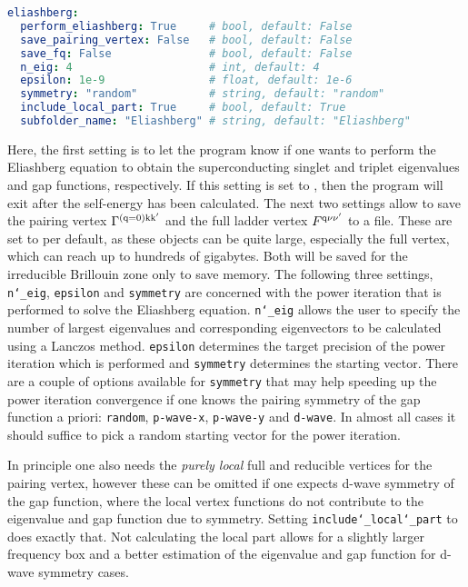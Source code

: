\documentclass[\main/main.tex]{subfiles}
\begin{document}
\begin{minipage}{\textwidth}%
\begin{lstlisting}[language=yaml]
eliashberg:
  perform_eliashberg: True     # bool, default: False
  save_pairing_vertex: False   # bool, default: False
  save_fq: False               # bool, default: False
  n_eig: 4                     # int, default: 4
  epsilon: 1e-9                # float, default: 1e-6
  symmetry: "random"           # string, default: "random"
  include_local_part: True     # bool, default: True
  subfolder_name: "Eliashberg" # string, default: "Eliashberg"
\end{lstlisting}
\end{minipage}
Here, the first setting is to let the program know if one wants to perform the Eliashberg equation to obtain the superconducting singlet and triplet eigenvalues and gap functions, respectively. If this setting is set to , then the program will exit after the self-energy has been calculated. The next two settings allow to save the pairing vertex $\Gamma^{(\text{q}=0)\text{k}\text{k}'}$ and the full ladder vertex $F^{\text{q}\nu\nu'}$ to a file. These are set to  per default, as these objects can be quite large, especially the full vertex, which can reach up to hundreds of gigabytes. Both will be saved for the irreducible Brillouin zone only to save memory. The following three settings, \texttt{n\char`_eig}, \texttt{epsilon} and \texttt{symmetry} are concerned with the power iteration that is performed to solve the Eliashberg equation. \texttt{n\char`_eig} allows the user to specify the number of largest eigenvalues and corresponding eigenvectors to be calculated using a Lanczos method. \texttt{epsilon} determines the target precision of the power iteration which is performed and \texttt{symmetry} determines the starting vector. There are a couple of options available for \texttt{symmetry} that may help speeding up the power iteration convergence if one knows the pairing symmetry of the gap function a priori: \texttt{random}, \texttt{p-wave-x}, \texttt{p-wave-y} and \texttt{d-wave}. In almost all cases it should suffice to pick a random starting vector for the power iteration. 

In principle one also needs the \textit{purely local} full and reducible vertices for the pairing vertex, however these can be omitted if one expects d-wave symmetry of the gap function, where the local vertex functions do not contribute to the eigenvalue and gap function due to symmetry. Setting \texttt{include\char`_local\char`_part} to  does exactly that. Not calculating the local part allows for a slightly larger frequency box and a better estimation of the eigenvalue and gap function for d-wave symmetry cases.
\end{document}
